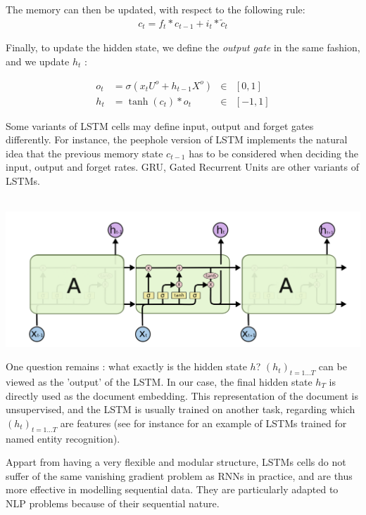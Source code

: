 \documentclass{article}
\begin{document}
\noindent The memory can then be updated, with respect to the following rule:
\begin{align*}
    c_t = f_t * c_{t-1} + i_t * \tilde{c}_t
\end{align*}

\noindent Finally, to update the hidden state, we define the \textit{output gate} in the same fashion, and we update $h_t$ :

\begin{align*}
    o_t &= \sigma \left (x_t U^o + h_{t-1} X^{o}\right ) &\in& [0,1]  \\
    h_t &= \tanh (c_t) * o_t  &\in& [-1, 1]
\end{align*}




Some variants of LSTM cells may define input, output and forget gates differently. For instance,
the peephole version of LSTM implements the natural idea that the previous memory state $c_{t-1}$
has to be considered when deciding the input, output and forget rates.  GRU, Gated Recurrent Units 
are other variants of LSTMs. \\ \par 

\begin{center}
    \label{fig:LSTM1}
    \includegraphics[scale=0.55]{LSTM.png}
\end{center}
One question remains : what exactly is the hidden state $h$? 
$(h_t)_{t=1...T}$ can be viewed as the 'output' of the LSTM.  
In our case, the final hidden state $h_T$ is directly used as 
the document embedding. This representation of the document 
is unsupervised, and the LSTM is usually trained on another 
task, regarding which $(h_t)_{t=1...T}$ are features (see for 
instance \cite{Lample_2016} for an example of LSTMs trained 
for named entity recognition). 

Appart from having a very flexible and modular structure,
 LSTMs cells do not suffer of the same 
vanishing gradient problem as RNNs in practice,
 and are thus more effective
in modelling sequential data. They are particularly adapted 
to NLP problems because of their 
sequential nature. 
\end{document}
